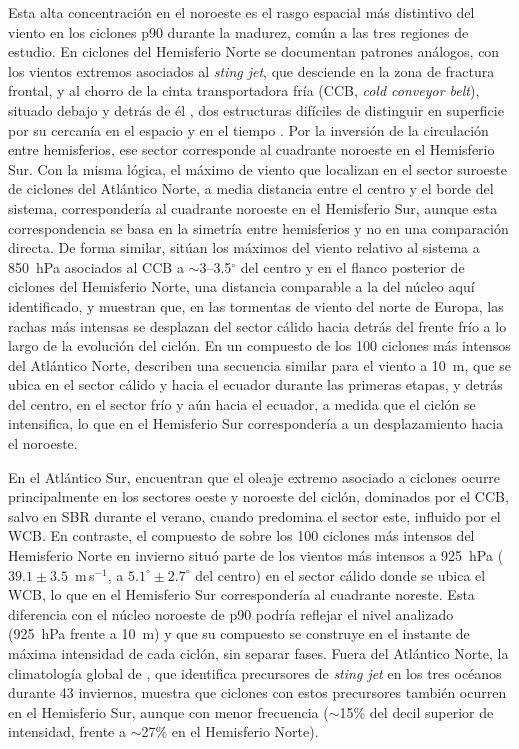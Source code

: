 Esta alta concentración en el noroeste es el rasgo espacial más distintivo del viento en los ciclones p90 durante la madurez, común a las tres regiones de estudio. 
En ciclones del Hemisferio Norte se documentan patrones análogos, con los vientos extremos asociados al \textit{sting jet}, que desciende en la zona de fractura frontal, y al chorro de la cinta transportadora fría (CCB, \textit{cold conveyor belt}), situado debajo y detrás de él \citep{clark2005sting, clark2018sting}, dos estructuras difíciles de distinguir en superficie por su cercanía en el espacio y en el tiempo \citep{eisenstein2023identification}. Por la inversión de la circulación entre hemisferios, ese sector corresponde al cuadrante noroeste en el Hemisferio Sur.
Con la misma lógica, el máximo de viento que \citet{rudeva2011composite} localizan en el sector suroeste de ciclones del Atlántico Norte, a media distancia entre el centro y el borde del sistema, correspondería al cuadrante noroeste en el Hemisferio Sur, aunque esta correspondencia se basa en la simetría entre hemisferios y no en una comparación directa.
De forma similar, \citet{priestley2022improved} sitúan los máximos del viento relativo al sistema a 850~hPa asociados al CCB a ${\sim}$3--3.5$^{\circ}$ del centro y en el flanco posterior de ciclones del Hemisferio Norte, una distancia comparable a la del núcleo aquí identificado, y \citet{laurila2021characteristics} muestran que, en las tormentas de viento del norte de Europa, las rachas más intensas se desplazan del sector cálido hacia detrás del frente frío a lo largo de la evolución del ciclón. En un compuesto de los 100 ciclones más intensos del Atlántico Norte, \citet{gentile2025response} describen una secuencia similar para el viento a 10~m, que se ubica en el sector cálido y hacia el ecuador durante las primeras etapas, y detrás del centro, en el sector frío y aún hacia el ecuador, a medida que el ciclón se intensifica, lo que en el Hemisferio Sur correspondería a un desplazamiento hacia el noroeste.

En el Atlántico Sur, \citet{gramcianinov2023impact} encuentran que el oleaje extremo asociado a ciclones ocurre principalmente en los sectores oeste y noroeste del ciclón, dominados por el CCB, salvo en SBR durante el verano, cuando predomina el sector este, influido por el WCB.
En contraste, el compuesto de \citet{catto2010climate} sobre los 100 ciclones más intensos del Hemisferio Norte en invierno situó parte de los vientos más intensos a 925~hPa (${39.1 \pm 3.5}$~m\,s$^{-1}$, a ${5.1^{\circ} \pm 2.7^{\circ}}$ del centro) en el sector cálido donde se ubica el WCB, lo que en el Hemisferio Sur correspondería al cuadrante noreste. Esta diferencia con el núcleo noroeste de p90 podría reflejar el nivel analizado (925~hPa frente a 10~m) y que su compuesto se construye en el instante de máxima intensidad de cada ciclón, sin separar fases.
Fuera del Atlántico Norte, la climatología global de \citet{gray2024global}, que identifica precursores de \textit{sting jet} en los tres océanos durante 43 inviernos, muestra que ciclones con estos precursores también ocurren en el Hemisferio Sur, aunque con menor frecuencia (${\sim}$15\% del decil superior de intensidad, frente a ${\sim}$27\% en el Hemisferio Norte).

